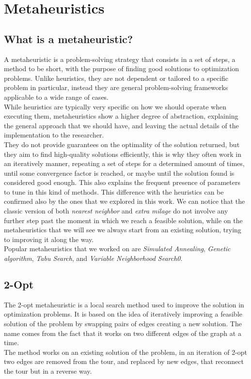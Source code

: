 \chapter{Metaheuristics}

\section{What is a metaheuristic?}
A metaheuristic is a problem-solving strategy that consists in a set of steps, a method to be short,
with the purpose of finding good solutions to optimization problems. Unlike heuristics, they are not dependent or 
tailored to a specific problem in particular, instead they are general problem-solving frameworks applicable
to a wide range of cases.\\
While heuristics are typically very specific on how we should operate when executing them, metaheuristics show a 
higher degree of abstraction, explaining the general approach that we should have, and leaving the actual details
of the implementation to the researcher.\\
They do not provide guarantees on the optimality of the solution returned, but they aim to find high-quality solutions
efficiently, this is why they often work in an iteratively manner, repeating a set of steps for a determined
amount of times, until some convergence factor is reached, or maybe until the solution found is considered good enough. 
This also explains the frequent presence of parameters to tune in this kind of methods. This difference with the heuristics 
can be confirmed also by the ones that we explored in this work. We can notice that the classic version of both 
\textit{nearest neighbor} and \textit{extra milage} do not involve any further step past the moment in which we 
reach a feasible solution, while on the metaheuristics that we will see we always start from an existing solution,
trying to improving it along the way.\\
Popular metaheuristics that we worked on are \textit{Simulated Annealing}, \textit{Genetic algorithm}, \textit{Tabu Search},
and \textit{Variable Neighborhood Search0}.


\section{2-Opt}
The 2-opt metaheuristic is a local search method used to improve the solution in optimization problems. It is based on the
idea of iteratively improving a feasible solution of the problem by swapping pairs of edges creating a new solution. The name
comes from the fact that it works on two different edges of the graph at a time.\\
The method works on an existing solution of the problem, in an iteration of 2-opt two edges are removed from the tour, and replaced
by new edges, that reconnect the tour but in a reverse way.\\


